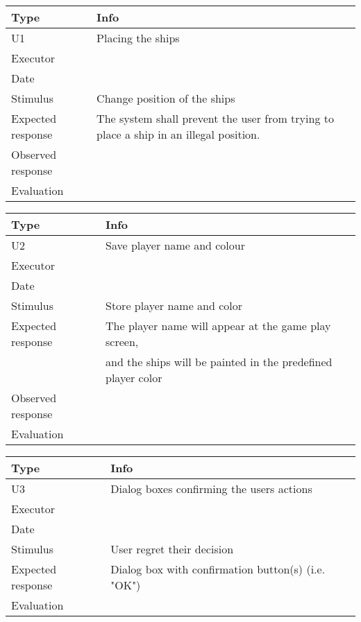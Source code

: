\vspace{0.5em}

\noindent
\begin{tabular}{|p{2cm}|p{10cm}|}
	\hline
	\bf{Type}	& \bf{Info} \\
	\hline
	U1			& Placing the ships \\
	Executor	&  \\
	Date		& \date{\today} \\
	Stimulus	& Change position of the ships \\
	Expected response & The system shall prevent the user from trying to place a ship in an illegal position.\\
	Observed response & \\
	Evaluation	&  \\
	\hline
\end{tabular}

\vspace{0.5em}

\noindent
\begin{tabular}{|p{2cm}|p{10cm}|}
	\hline
	\bf{Type}	& \bf{Info} \\
	\hline
	U2			& Save player name and colour \\
	Executor	&  \\
	Date		& \date{\today} \\
	Stimulus	& Store player name and color \\
	Expected response & The player name will appear at the game play screen, \\
             & and the ships will be painted in the predefined player color  \\
	Observed response & \\
	Evaluation	&  \\
	\hline
\end{tabular}

\vspace{0.5em}

\noindent
\begin{tabular}{|p{2cm}|p{10cm}|}
	\hline
	\bf{Type}	& \bf{Info} \\
	\hline
	U3			& Dialog boxes confirming the users actions \\
	Executor	&  \\
	Date		& \date{\today} \\
	Stimulus	& User regret their decision \\
	Expected response & Dialog box with confirmation button(s) (i.e. "OK")\\
	Evaluation	&  \\
	\hline
\end{tabular}

